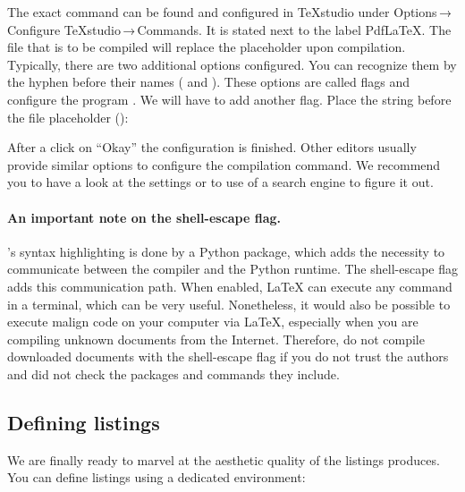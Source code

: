 
\noindent The exact command can be found and configured in \TeX{}studio under Options\,→\,Configure \TeX{}studio\,→\,Commands.
It is stated next to the label Pdf\LaTeX{}.
The file that is to be compiled will replace the placeholder  upon compilation.
Typically, there are two additional options configured.
You can recognize them by the hyphen before their names ( and ).
These options are called flags and configure the program . 
We will have to add another flag.
Place the string  before the file placeholder ():


\noindent After a click on \enquote{Okay} the configuration is finished.
Other editors usually provide similar options to configure the compilation command.
We recommend you to have a look at the settings or to use of a search engine to figure it out.

\paragraph{An important note on the shell-escape flag.} 's syntax highlighting is done by a Python package, which adds the necessity to communicate between the compiler and the Python runtime.
The shell-escape flag adds this communication path.
When enabled, \LaTeX{} can execute any command in a terminal, which can be very useful.
Nonetheless, it would also be possible to execute malign code on your computer via \LaTeX{}, especially when you are compiling unknown documents from the Internet.
Therefore, do not compile downloaded documents with the shell-escape flag if you do not trust the authors and did not check the packages and commands they include.

\subsection{Defining listings}
We are finally ready to marvel at the aesthetic quality of the listings  produces.
You can define listings using a dedicated environment:


